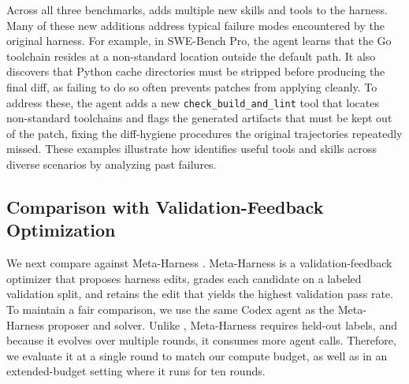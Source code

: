 Across all three benchmarks, \method{} adds multiple new skills and tools to the harness.
Many of these new additions address typical failure modes encountered by the original harness.
For example, in SWE-Bench Pro, the agent learns that the Go toolchain resides at a non-standard location outside the default path.
It also discovers that Python cache directories must be stripped before producing the final diff, as failing to do so often prevents patches from applying cleanly.
To address these, the agent adds a new \texttt{check\_build\_and\_lint} tool that locates non-standard toolchains and flags the generated artifacts that must be kept out of the patch, fixing the diff-hygiene procedures the original trajectories repeatedly missed.
These examples illustrate how \method{} identifies useful tools and skills across diverse scenarios by analyzing past failures.

\subsection{Comparison with Validation-Feedback Optimization}

We next compare \method{} against Meta-Harness \citep{lee2026metaharness}.
Meta-Harness is a validation-feedback optimizer that proposes harness edits, grades each candidate on a labeled validation split, and retains the edit that yields the highest validation pass rate.
To maintain a fair comparison, we use the same Codex agent as the Meta-Harness proposer and solver.
Unlike \method{}, Meta-Harness requires held-out labels, and because it evolves over multiple rounds, it consumes more agent calls.
Therefore, we evaluate it at a single round to match our compute budget, as well as in an extended-budget setting where it runs for ten rounds.

\begin{table}[t]
\caption{\method{} versus Meta-Harness, a validation-feedback optimizer, on SWE-Bench Pro. \emph{Agent calls} is the optimization-time budget relative to one \method{} run. Held-out pass rate on the same split as Table~\ref{tab:main}.}
\label{tab:meta-harness}
\centering
\footnotesize
\setlength{\tabcolsep}{4pt}
\vspace{-1.5em}
\end{table}

